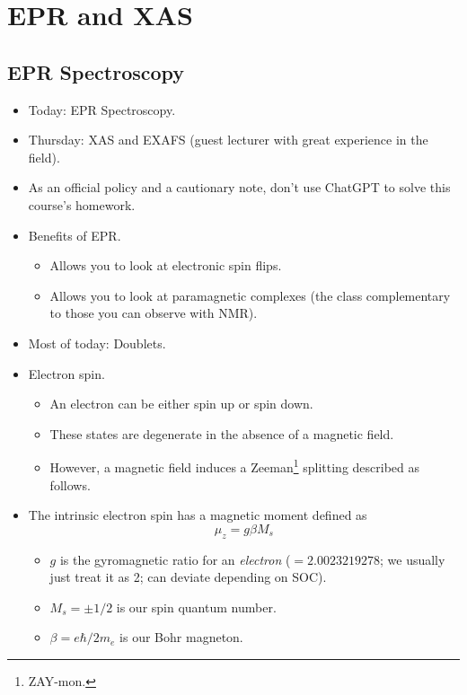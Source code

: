\documentclass[../notes.tex]{subfiles}
\begin{document}
\chapter{EPR and XAS}
\section{EPR Spectroscopy}
\begin{itemize}
    \item {}Today: EPR Spectroscopy.
    \item Thursday: XAS and EXAFS (guest lecturer with great experience in the field).
    \item As an official policy and a cautionary note, don't use ChatGPT to solve this course's homework.
    \item Benefits of EPR.
    \begin{itemize}
        \item Allows you to look at electronic spin flips.
        \item Allows you to look at paramagnetic complexes (the class complementary to those you can observe with NMR).
    \end{itemize}
    \item Most of today: Doublets.
    \item Electron spin.
    \begin{itemize}
        \item An electron can be either spin up or spin down.
        \item These states are degenerate in the absence of a magnetic field.
        \item However, a magnetic field induces a Zeeman\footnote{ZAY-mon.} splitting described as follows.
    \end{itemize}
    \item The intrinsic electron spin has a magnetic moment defined as
    \begin{equation*}
        \mu_z = g\beta M_s
    \end{equation*}
    \begin{itemize}
        \item $g$ is the gyromagnetic ratio for an \emph{electron} ($=2.0023219278$; we usually just treat it as 2; can deviate depending on SOC).
        \item $M_s=\pm 1/2$ is our spin quantum number.
        \item $\beta=e\hbar/2m_e$ is our Bohr magneton.
    \end{itemize}

\end{itemize}
\end{document}
